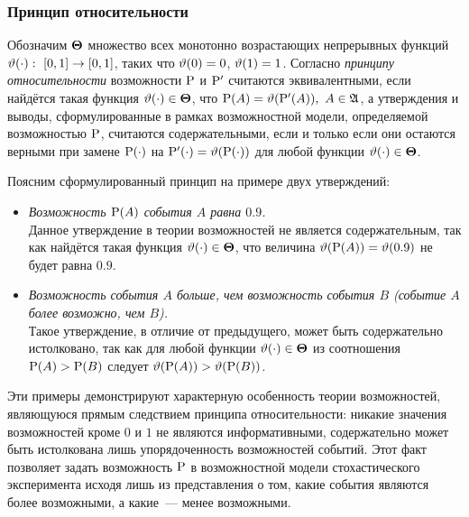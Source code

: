 \begin{comment}
В свою очередь условие \ref{item_poss_rel_3}) выражает естественное стремление определить возможность $\P$ так, чтобы более вероятные события были одновременно и более возможными. При этом на возможность $\P$ не налагается никаких других требований, что приводит нас к следующему принципу, занимающему центральное место в теории возможностей Пытьева.

\end{comment}

\subsubsection{Принцип относительности}
\label{sec:sec_20151029_02}

Обозначим $\bTheta$ множество всех монотонно возрастающих непрерывных функций $\vtheta(\cdot):\ [0,1]\to[0,1]$, таких что $\vtheta(0) = 0$, $\vtheta(1) = 1$.
Согласно \emph{принципу относительности} возможности $\P$ и $\P'$ считаются эквивалентными, если найдётся такая функция $\vtheta(\cdot)\in\bTheta$, что $\P(A) = \vtheta(\P'(A)),\ A\in\Alg$, а утверждения и выводы, сформулированные в рамках возможностной модели, определяемой возможностью $\P$, считаются содержательными, если и только если они остаются верными при замене $\P(\cdot)$ на $\P'(\cdot) = \vtheta(\P(\cdot))$ для любой функции $\vtheta(\cdot)\in\bTheta$.

Поясним сформулированный принцип на примере двух утверждений:
\begin{itemize}
\item
    \emph{Возможность $\P(A)$ события $A$ равна $0.9$.}\\
    Данное утверждение в теории возможностей не является содержательным, так как найдётся такая функция $\vtheta(\cdot)\in\bTheta$, что величина $\vtheta(\P(A))=\vtheta(0.9)$ не будет равна $0.9$.

\item
    \emph{Возможность события $A$ больше, чем возможность события $B$ (событие $A$ более возможно, чем $B$).}\\
    Такое утверждение, в отличие от предыдущего, может быть содержательно истолковано, так как для любой функции $\vtheta(\cdot)\in\bTheta$ из соотношения $\P(A)>\P(B)$ следует $\vtheta(\P(A))>\vtheta(\P(B))$.
\end{itemize}

Эти примеры демонстрируют характерную особенность теории возможностей, являющуюся прямым следствием принципа относительности: никакие значения возможностей кроме $0$ и $1$ не являются информативными, содержательно может быть истолкована лишь упорядоченность возможностей событий. Этот факт позволяет задать возможность $\P$ в возможностной модели стохастического эксперимента исходя лишь из представления о том, какие события являются более возможными, а какие~--- менее возможными.

